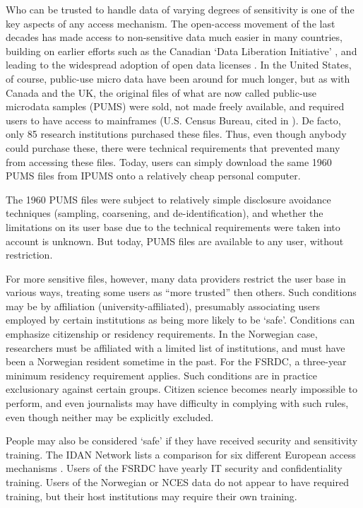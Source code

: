 Who can be trusted to handle data of varying degrees of sensitivity is one of the key aspects of any access mechanism. The open-access movement of the last decades has made access to non-sensitive data much easier in many countries, building on earlier efforts such as the Canadian `Data Liberation Initiative' \cite{currie2015social}, and leading to the widespread adoption of open data licenses \cite{statistics_canada_statistics_2012,uk_government_open_2014}. In the United States, of course, public-use micro data have been around for much longer, but as with Canada and the UK, the original files of what are now called public-use microdata samples (PUMS) were sold, not made freely available, and required users to have access to mainframes (U.S. Census Bureau, cited in \cite{anderson_american_2015}). De facto, only 85 research institutions \cite{anderson_american_2015} purchased these files. Thus, even though anybody could purchase these, there were technical requirements that prevented many from accessing these files. Today,  users can simply download the same 1960 PUMS files from IPUMS \cite{ruggles_ipums_2021} onto a relatively cheap personal computer. 

The 1960 PUMS files were subject to relatively simple disclosure avoidance techniques (sampling, coarsening, and de-identification), and whether the limitations on its user base due to the technical requirements were taken into account is unknown. But today, PUMS files are available to any user, without restriction. 

For more sensitive files, however, many data providers restrict the user base in various ways, treating some users as ``more trusted'' then others. Such conditions may be by affiliation (university-affiliated), presumably associating users employed  by certain institutions as being more likely to be `safe'. Conditions can emphasize citizenship or residency requirements. In the Norwegian case, researchers must be affiliated with a limited list of institutions, and must have been a Norwegian resident sometime in the past. For the FSRDC, a three-year minimum residency requirement applies. Such conditions are in practice exclusionary against certain groups. Citizen science becomes nearly impossible to perform, and even journalists may have difficulty in complying with such rules, even though neither may be explicitly excluded. 

People may also be considered `safe' if they have received security and sensitivity training. The IDAN Network lists a comparison for six different European access mechanisms \cite{idan_network_idan_nodate}. Users of the FSRDC have yearly IT security and confidentiality training. Users of the Norwegian or NCES data do not appear to have required training, but their host institutions may require their own training. 

